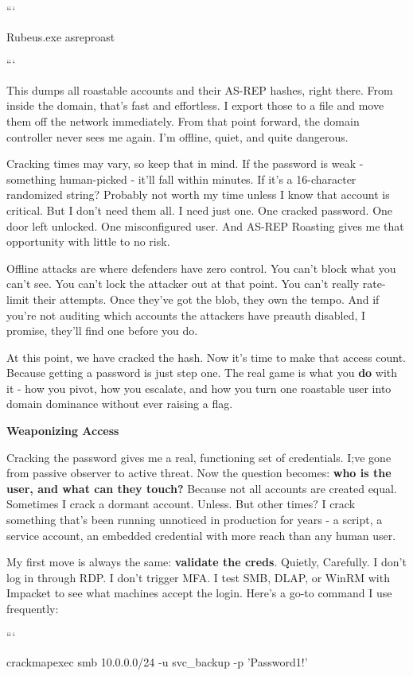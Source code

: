 ```

Rubeus.exe asreproast

```

This dumps all roastable accounts and their AS-REP hashes, right there. From inside the domain, that’s fast and effortless. I export those to a file and move them off the network immediately. From that point forward, the domain controller never sees me again. I’m offline, quiet, and quite dangerous.

Cracking times may vary, so keep that in mind. If the password is weak - something human-picked - it’ll fall within minutes. If it’s a 16-character randomized string? Probably not worth my time unless I know that account is critical. But I don’t need them all. I need just one. One cracked password. One door left unlocked. One misconfigured user. And AS-REP Roasting gives me that opportunity with little to no risk.

Offline attacks are where defenders have zero control. You can’t block what you can’t see. You can’t lock the attacker out at that point. You can’t really rate-limit their attempts. Once they’ve got the blob, they own the tempo. And if you’re not auditing which accounts the attackers have preauth disabled, I promise, they’ll find one before you do.

At this point, we have cracked the hash. Now it’s time to make that access count. Because getting a password is just step one. The real game is what you \textbf{do} with it - how you pivot, how you escalate, and how you turn one roastable user into domain dominance without ever raising a flag.

\textbf{Weaponizing Access}

Cracking the password gives me a real, functioning set of credentials. I;ve gone from passive observer to active threat. Now the question becomes: \textbf{who is the user, and what can they touch? }Because not all accounts are created equal. Sometimes I crack a dormant account. Unless. But other times? I crack something that’s been running unnoticed in production for years - a script, a service account, an embedded credential with more reach than any human user.

My first move is always the same: \textbf{validate the creds}. Quietly, Carefully. I don’t log in through RDP. I don’t trigger MFA. I test SMB, DLAP, or WinRM with Impacket to see what machines accept the login. Here’s a go-to command I use frequently:

```

crackmapexec smb 10.0.0.0/24 -u svc\_backup -p 'Password1!'

